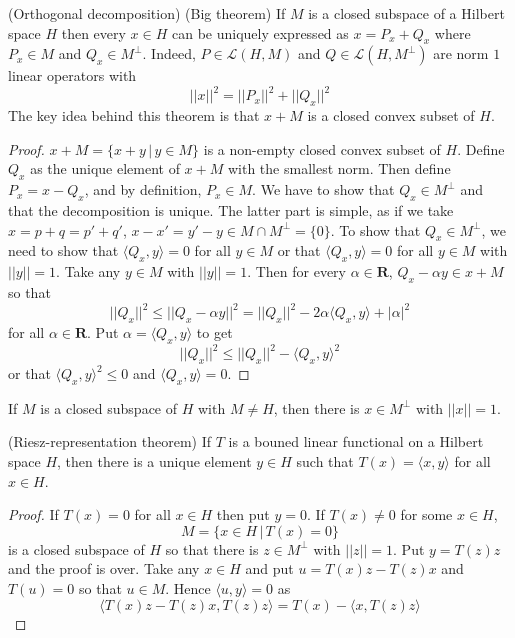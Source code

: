 \vspace{2ex}
\begin{thm}
(Orthogonal decomposition) (Big theorem) If $M$ is a closed subspace of a Hilbert space $H$ then every $x\in H$ can be uniquely expressed as $x=P_{x}+Q_{x}$ where $P_{x}\in M$ and $Q_{x}\in M^{\perp}$. Indeed, $P\in \mathcal{L}(H,M)$ and $Q\in \mathcal{L}(H,M^{\perp})$ are norm $1$ linear operators with
\[||x||^2=||P_{x}||^2+||Q_{x}||^2\]
The key idea behind this theorem is that $x+M$ is a closed convex subset of $H$. 
\end{thm}
\vspace{2ex}
\begin{proof}
$x+M=\{x+y \,|\, y\in M\}$ is a non-empty closed convex subset of $H$. Define $Q_{x}$ as the unique element of $x+M$ with the smallest norm. Then define $P_{x}=x-Q_{x}$, and by definition, $P_{x}\in M$. 
\newline
\newline
We have to show that $Q_{x}\in M^{\perp}$ and that the decomposition is unique. The latter part is simple, as if we take $x=p+q=p'+q'$, $x-x'=y'-y\in M\cap M^{\perp}=\{0\}$. To show that $Q_{x}\in M^{\perp}$, we need to show that $\langle Q_{x},y\rangle =0$ for all $y\in M$ or that $\langle Q_{x},y\rangle =0$ for all $y\in M$ with $||y||=1$. 
\newline
\newline
Take any $y\in M$ with $||y||=1$. Then for every $\alpha \in {\bm R}$, $Q_{x}-\alpha y\in x+M$ so that
\[||Q_{x}||^2\leq ||Q_{x}-\alpha y||^2=||Q_{x}||^2-2\alpha \langle Q_{x},y\rangle +|\alpha |^2\] 
for all $\alpha \in {\bm R}$. Put $\alpha =\langle Q_{x},y\rangle $ to get
\[||Q_{x}||^2\leq ||Q_{x}||^2-\langle Q_{x},y\rangle ^2\]
or that $\langle Q_{x},y\rangle ^2\leq 0$ and $\langle Q_{x},y\rangle =0$.
\end{proof}
\vspace{2ex}
\begin{cor}
If $M$ is a closed subspace of $H$ with $M\ne H$, then there is $x\in M^{\perp}$ with $||x||=1$.
\end{cor}
\vspace{2ex}
\begin{thm}
(Riesz-representation theorem) If $T$ is a bouned linear functional on a Hilbert space $H$, then there is a unique element $y\in H$ such that $T(x)=\langle x,y\rangle $ for all $x\in H$. 
\end{thm}
\vspace{2ex}
\begin{proof}
If $T(x)=0$ for all $x\in H$ then put $y=0$. If $T(x)\ne 0$ for some $x\in H$,
\[M=\{x\in H \,|\, T(x)=0\}\]
is a closed subspace of $H$ so that there is $z\in M^{\perp}$ with $||z||=1$. Put $y=T(z)z$ and the proof is over. Take any $x\in H$ and put $u=T(x)z-T(z)x$ and $T(u)=0$ so that $u\in M$. Hence $\langle u,y\rangle =0$ as 
\[\langle T(x)z-T(z)x,T(z)z\rangle= T(x)-\langle x,T(z)z\rangle \]
\end{proof}
\vspace{2ex}

